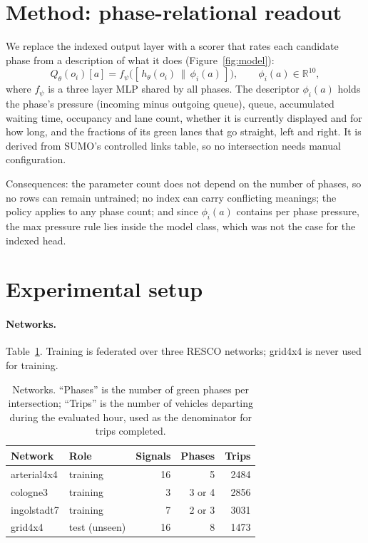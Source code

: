 \documentclass[10pt,twocolumn,a4paper]{article}
\begin{document}
\section{Method: phase-relational readout}
We replace the indexed output layer with a scorer that rates each candidate phase from a
description of what it does (Figure~\ref{fig:model}):
\[
Q_\theta(o_i)[a]=f_\psi\big([\,h_\theta(o_i)\,\|\,\phi_i(a)\,]\big),
\qquad \phi_i(a)\in\mathbb{R}^{10},
\]
where $f_\psi$ is a three layer MLP shared by all phases. The descriptor $\phi_i(a)$ holds
the phase's pressure (incoming minus outgoing queue), queue, accumulated waiting time,
occupancy and lane count, whether it is currently displayed and for how long, and the
fractions of its green lanes that go straight, left and right. It is derived from SUMO's
controlled links table, so no intersection needs manual configuration.

Consequences: the parameter count does not depend on the number of phases, so no rows can
remain untrained; no index can carry conflicting meanings; the policy applies to any phase
count; and since $\phi_i(a)$ contains per phase pressure, the max pressure rule lies inside
the model class, which was not the case for the indexed head.

\section{Experimental setup}

\paragraph{Networks.} Table~\ref{tab:nets}. Training is federated over three RESCO networks;
grid4x4 is never used for training.

\begin{table}[H]
\centering\footnotesize
\begin{tabular}{|l|l|r|r|r|}
\hline
Network & Role & Signals & Phases & Trips \\ \hline
arterial4x4 & training & 16 & 5 & 2484 \\ \hline
cologne3 & training & 3 & 3 or 4 & 2856 \\ \hline
ingolstadt7 & training & 7 & 2 or 3 & 3031 \\ \hline
grid4x4 & test (unseen) & 16 & 8 & 1473 \\ \hline
\end{tabular}
\caption{Networks. ``Phases'' is the number of green phases per intersection; ``Trips'' is the
number of vehicles departing during the evaluated hour, used as the denominator for trips completed.}
\label{tab:nets}
\end{table}
\end{document}
